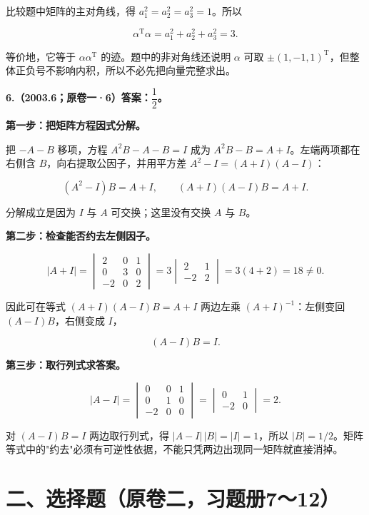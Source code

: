 \documentclass[UTF8,11pt,fontset=windows]{ctexart}
\begin{document}
比较题中矩阵的主对角线，得 $a_1^2=a_2^2=a_3^2=1$。所以

$$
\boxed{\alpha^{\mathrm T}\alpha=a_1^2+a_2^2+a_3^2=3.}
$$

等价地，它等于 $\alpha\alpha^{\mathrm T}$ 的迹。题中的非对角线还说明 $\alpha$ 可取 $\pm(1,-1,1)^{\mathrm T}$，但整体正负号不影响内积，所以不必先把向量完整求出。

\clearpage

\textbf{6.（2003.6；原卷一·6）答案：$\dfrac12$。}

\textbf{第一步：把矩阵方程因式分解。}

把 $-A-B$ 移项，方程 $A^2B-A-B=I$ 成为 $A^2B-B=A+I$。左端两项都在右侧含 $B$，向右提取公因子，并用平方差 $A^2-I=(A+I)(A-I)$：

$$
(A^2-I)B=A+I,
\qquad (A+I)(A-I)B=A+I.
$$

分解成立是因为 $I$ 与 $A$ 可交换；这里没有交换 $A$ 与 $B$。

\textbf{第二步：检查能否约去左侧因子。}

$$
|A+I|=
\begin{vmatrix}2&0&1\\0&3&0\\-2&0&2\end{vmatrix}
=3\begin{vmatrix}2&1\\-2&2\end{vmatrix}=3(4+2)=18\ne0.
$$

因此可在等式 $(A+I)(A-I)B=A+I$ 两边左乘 $(A+I)^{-1}$：左侧变回 $(A-I)B$，右侧变成 $I$，

$$
(A-I)B=I.
$$

\textbf{第三步：取行列式求答案。}

$$
|A-I|=
\begin{vmatrix}0&0&1\\0&1&0\\-2&0&0\end{vmatrix}
=\begin{vmatrix}0&1\\-2&0\end{vmatrix}=2.
$$

对 $(A-I)B=I$ 两边取行列式，得 $|A-I|\,|B|=|I|=1$，所以 $\boxed{|B|=1/2}$。矩阵等式中的"约去"必须有可逆性依据，不能只凭两边出现同一矩阵就直接消掉。

\clearpage

\section*{二、选择题（原卷二，习题册7～12）}
\end{document}
